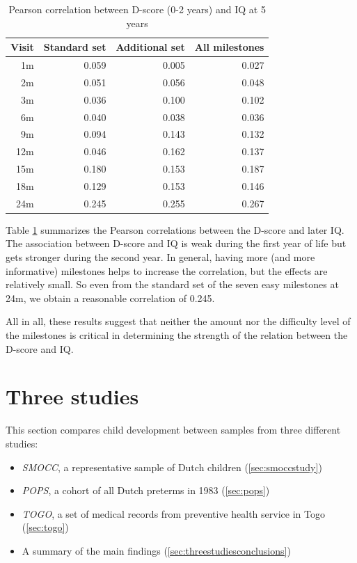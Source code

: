 \documentclass[
]{book}
\providecommand{\tightlist}{%
  \setlength{\itemsep}{0pt}\setlength{\parskip}{0pt}}
\begin{document}
\begin{table}

\caption{\label{tab:cordiq}Pearson correlation between D-score (0-2 years) and IQ at 5 years}
\centering
\begin{tabular}[t]{rrrr}
\toprule
Visit & Standard set & Additional set & All milestones\\
\midrule
1m & 0.059 & 0.005 & 0.027\\
2m & 0.051 & 0.056 & 0.048\\
3m & 0.036 & 0.100 & 0.102\\
6m & 0.040 & 0.038 & 0.036\\
9m & 0.094 & 0.143 & 0.132\\
\addlinespace
12m & 0.046 & 0.162 & 0.137\\
15m & 0.180 & 0.153 & 0.187\\
18m & 0.129 & 0.153 & 0.146\\
24m & 0.245 & 0.255 & 0.267\\
\bottomrule
\end{tabular}
\end{table}

Table \ref{tab:cordiq} summarizes the Pearson correlations between the D-score and later IQ. The association between D-score and IQ is weak during the first year of life but gets stronger during the second year. In general, having more (and more informative) milestones helps to increase the correlation, but the effects are relatively small. So even from the standard set of the seven easy milestones at 24m, we obtain a reasonable correlation of 0.245.

All in all, these results suggest that neither the amount nor the difficulty level of the milestones is critical in determining the strength of the relation between the D-score and IQ.

\hypertarget{ch:threestudies}{%
\chapter{Three studies}\label{ch:threestudies}}

This section compares child development between samples from three different studies:

\begin{itemize}
\tightlist
\item
  \emph{SMOCC}, a representative sample of Dutch children (\ref{sec:smoccstudy})
\item
  \emph{POPS}, a cohort of all Dutch preterms in 1983 (\ref{sec:pops})
\item
  \emph{TOGO}, a set of medical records from preventive health service in Togo (\ref{sec:togo})
\item
  A summary of the main findings (\ref{sec:threestudiesconclusions})
\end{itemize}
\end{document}
